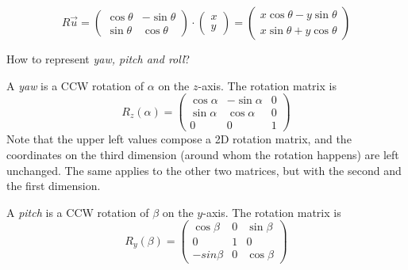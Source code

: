 \[
	R \vec u =
	{\begin{pmatrix}
		\cos \theta &-\sin \theta \\
		\sin \theta &\cos \theta
	\end{pmatrix}}
	\cdot
	{\begin{pmatrix}
		x \\
		y
	\end{pmatrix}} =
	{\begin{pmatrix}
		x\cos \theta -y\sin \theta \\
		x\sin \theta +y\cos \theta
	\end{pmatrix}}
\]
\bigbreak

How to represent \textit{yaw, pitch and roll}?
\bigbreak

A \textit{yaw} is a CCW rotation of $\alpha$ on the $z$-axis. The rotation matrix is
\[
	R_z(\alpha) =
	\begin{pmatrix}
		\cos\alpha & -\sin\alpha & 0 \\
		\sin\alpha & \cos\alpha & 0 \\
		0 & 0 & 1
	\end{pmatrix}
\]
Note that the upper left values compose a 2D rotation matrix, and the coordinates on the third dimension (around whom the rotation happens) are left unchanged. The same applies to the other two matrices, but with the second and the first dimension.
\bigbreak

A \textit{pitch} is a CCW rotation of $\beta$ on the $y$-axis. The rotation matrix is
\[
	R_y(\beta) =
	\begin{pmatrix}
		\cos\beta & 0 & \sin\beta \\
		0 & 1 & 0 \\
		-sin\beta & 0 & \cos\beta
	\end{pmatrix}
\]

